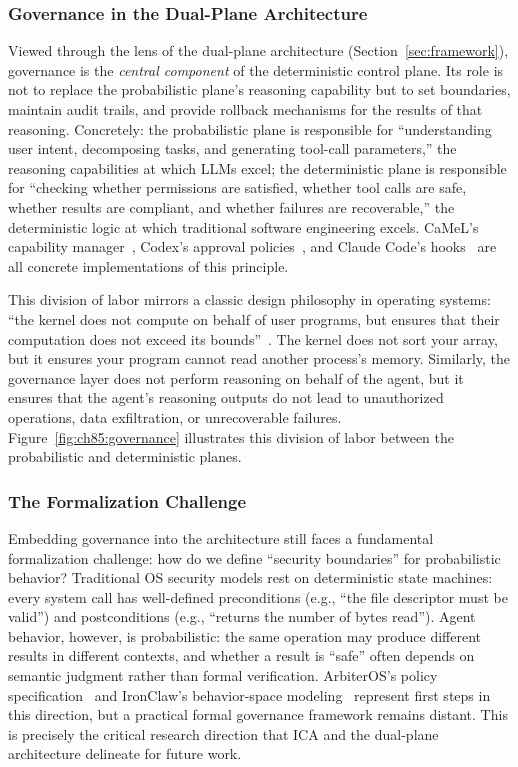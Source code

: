 \subsubsection{Governance in the Dual-Plane Architecture}
Viewed through the lens of the dual-plane architecture (Section~\ref{sec:framework}), governance is the \emph{central component} of the deterministic control plane.
Its role is not to replace the probabilistic plane's reasoning capability but to set boundaries, maintain audit trails, and provide rollback mechanisms for the results of that reasoning.
Concretely:
the probabilistic plane is responsible for ``understanding user intent, decomposing tasks, and generating tool-call parameters,'' the reasoning capabilities at which LLMs excel;
the deterministic plane is responsible for ``checking whether permissions are satisfied, whether tool calls are safe, whether results are compliant, and whether failures are recoverable,'' the deterministic logic at which traditional software engineering excels.
CaMeL's capability manager~\cite{debenedetti2025camel}, Codex's approval policies~\cite{openai_codex_approvals_2026}, and Claude Code's hooks~\cite{anthropic_claudecode_security_2026} are all concrete implementations of this principle.

This division of labor mirrors a classic design philosophy in operating systems: ``the kernel does not compute on behalf of user programs, but ensures that their computation does not exceed its bounds''~\cite{ostep_2023}.
The kernel does not sort your array, but it ensures your program cannot read another process's memory.
Similarly, the governance layer does not perform reasoning on behalf of the agent, but it ensures that the agent's reasoning outputs do not lead to unauthorized operations, data exfiltration, or unrecoverable failures.
Figure~\ref{fig:ch85:governance} illustrates this division of labor between the probabilistic and deterministic planes.



\subsubsection{The Formalization Challenge}
Embedding governance into the architecture still faces a fundamental formalization challenge: how do we define ``security boundaries'' for probabilistic behavior?
Traditional OS security models rest on deterministic state machines: every system call has well-defined preconditions (e.g., ``the file descriptor must be valid'') and postconditions (e.g., ``returns the number of bytes read'').
Agent behavior, however, is probabilistic: the same operation may produce different results in different contexts, and whether a result is ``safe'' often depends on semantic judgment rather than formal verification.
ArbiterOS's policy specification~\cite{arbiteros2025} and IronClaw's behavior-space modeling~\cite{ironclaw2025} represent first steps in this direction, but a practical formal governance framework remains distant.
This is precisely the critical research direction that ICA and the dual-plane architecture delineate for future work.

